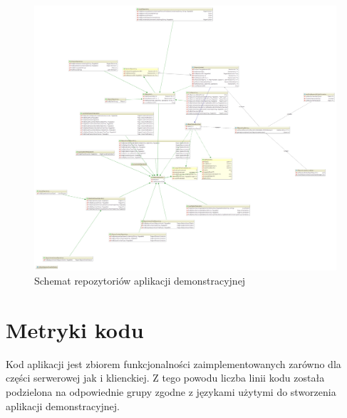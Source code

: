 	\begin{figure}[H]
		\centering
		\includegraphics[width=\textwidth]{images/springatom_model_repository}
		\caption[Schemat repozytoriów aplikacji demonstracyjnej]{
			Schemat repozytoriów aplikacji demonstracyjnej
		}
		\label{app:schema_org_agatom_springatom_repository}
	\end{figure}
	
		
\section{Metryki kodu}
	Kod aplikacji jest zbiorem funkcjonalności zaimplementowanych zarówno dla części serwerowej jak i klienckiej. Z tego powodu liczba linii kodu
	została podzielona na odpowiednie grupy zgodne z językami użytymi do stworzenia aplikacji demonstracyjnej.

